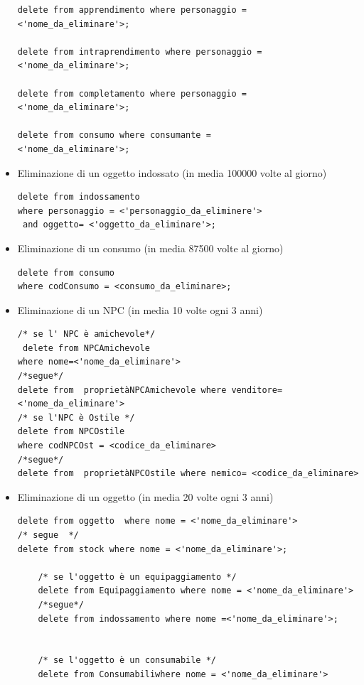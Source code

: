 \begin{itemize}
\begin{verbatim}
delete from apprendimento where personaggio =
<'nome_da_eliminare'>;

delete from intraprendimento where personaggio =
<'nome_da_eliminare'>;

delete from completamento where personaggio =
<'nome_da_eliminare'>;

delete from consumo where consumante =
<'nome_da_eliminare'>;

\end{verbatim}

\item Eliminazione di un oggetto indossato (in media 100000 volte al giorno)

\begin{verbatim}
delete from indossamento
where personaggio = <'personaggio_da_eliminere'>
 and oggetto= <'oggetto_da_eliminare'>;

\end{verbatim}
\item Eliminazione di un consumo (in media  87500 volte al giorno)

\begin{verbatim}
delete from consumo
where codConsumo = <consumo_da_eliminare>;

\end{verbatim}
\item Eliminazione di un NPC (in media 10 volte ogni 3 anni)

\begin{verbatim}
/* se l' NPC è amichevole*/
 delete from NPCAmichevole 
where nome=<'nome_da_eliminare'>
/*segue*/ 
delete from  proprietàNPCAmichevole where venditore= <'nome_da_eliminare'>
/* se l'NPC è Ostile */
delete from NPCOstile 
where codNPCOst = <codice_da_eliminare>
/*segue*/ 
delete from  proprietàNPCOstile where nemico= <codice_da_eliminare>

\end{verbatim}
\item Eliminazione di un oggetto (in media 20 volte ogni 3 anni)

\begin{verbatim}
delete from oggetto  where nome = <'nome_da_eliminare'>
/* segue  */
delete from stock where nome = <'nome_da_eliminare'>;

	/* se l'oggetto è un equipaggiamento */
	delete from Equipaggiamento where nome = <'nome_da_eliminare'>
	/*segue*/
	delete from indossamento where nome =<'nome_da_eliminare'>;
	

	/* se l'oggetto è un consumabile */
	delete from Consumabiliwhere nome = <'nome_da_eliminare'>


\end{verbatim}
\end{itemize}
